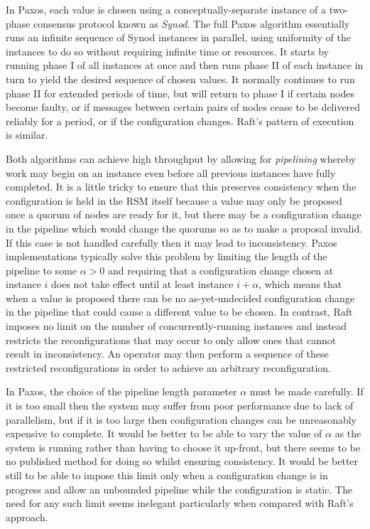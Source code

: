 \documentclass[journal]{IEEEtran}
\begin{document}
In Paxos, each value is chosen using a conceptually-separate instance of a
two-phase consensus protocol known as \textit{Synod}. The full Paxos algorithm
essentially runs an infinite sequence of Synod instances in parallel, using
uniformity of the instances to do so without requiring infinite time or
resources.  It starts by running phase I of all instances at once and then runs
phase II of each instance in turn to yield the desired sequence of chosen
values. It normally continues to run phase II for extended periods of time, but
will return to phase I if certain nodes become faulty, or if messages between
certain pairs of nodes cease to be delivered reliably for a period, or if the
configuration changes.  Raft's pattern of execution is similar.

Both algorithms can achieve high throughput by allowing for \textit{pipelining}
\cite{smart} whereby work may begin on an instance even before all previous
instances have fully completed. It is a little tricky to ensure that this
preserves consistency when the configuration is held in the RSM itself because
a value may only be proposed once a quorum of nodes are ready for it, but there
may be a configuration change in the pipeline which would change the quorums so
as to make a proposal invalid. If this case is not handled carefully then it
may lead to inconsistency. Paxos implementations typically solve this problem
by limiting the length of the pipeline to some $\alpha > 0$ and requiring that
a configuration change chosen at instance $i$ does not take effect until at
least instance $i + \alpha$, which means that when a value is proposed there
can be no as-yet-undecided configuration change in the pipeline that could
cause a different value to be chosen. In contrast, Raft imposes no limit on the
number of concurrently-running instances and instead restricts the
reconfigurations that may occur to only allow ones that cannot result in
inconsistency. An operator may then perform a sequence of these restricted
reconfigurations in order to achieve an arbitrary reconfiguration.

In Paxos, the choice of the pipeline length parameter $\alpha$ must be made
carefully. If it is too small then the system may suffer from poor performance
due to lack of parallelism, but if it is too large then configuration changes
can be unreasonably expensive to complete. It would be better to be able to
vary the value of $\alpha$ as the system is running rather than having to
choose it up-front, but there seems to be no published method for doing so
whilst ensuring consistency. It would be better still to be able to impose this
limit only when a configuration change is in progress and allow an unbounded
pipeline while the configuration is static. The need for any such limit seems
inelegant\cite{reconfiguring-a-state-machine} particularly when compared with
Raft's approach.
\end{document}
